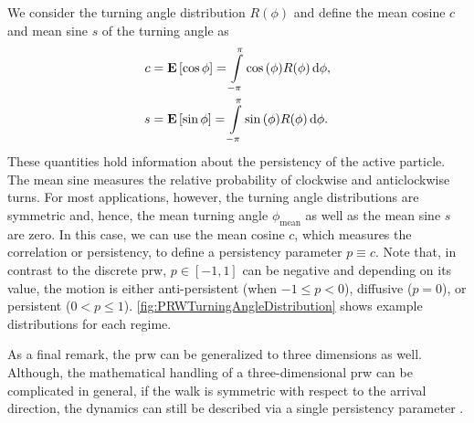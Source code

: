 We consider the turning angle distribution $R(\phi)$ and define the mean cosine $c$ and mean sine $s$ of the turning angle as
\begin{equation*}
 \begin{aligned}
  c &= \operatorname{\mathbf{E}}\left[\cos{\phi}\right] = \int\limits_{-\pi}^\pi \cos{(\phi)} R(\phi) \mathop{}\!\mathrm{d} \phi,
  \\
  s &= \operatorname{\mathbf{E}}\left[\sin{\phi}\right] = \int\limits_{-\pi}^\pi \sin{(\phi)} R(\phi) \mathop{}\!\mathrm{d} \phi.
 \end{aligned}
\end{equation*}
These quantities hold information about the persistency of the active particle. The mean sine measures the relative probability of clockwise and anticlockwise turns. For most applications, however, the turning angle distributions are symmetric and, hence, the mean turning angle $\phi_{\textrm{mean}}$ as well as the mean sine $s$ are zero. In this case, we can use the mean cosine $c$, which measures the correlation or persistency, to define a persistency parameter $p \equiv c$. Note that, in contrast to the discrete \ac{prw}, $p\in[-1,1]$ can be negative and depending on its value, the motion is either anti-persistent (when $-1 \leq p < 0$), diffusive ($p=0$), or persistent ($0<p\leq1$). \autoref{fig:PRWTurningAngleDistribution} shows example distributions for each regime.

As a final remark, the \ac{prw} can be generalized to three dimensions as well. Although, the mathematical handling of a three-dimensional \ac{prw} can be complicated in general, if the walk is symmetric with respect to the arrival direction, the dynamics can still be described via a single persistency parameter \cite{sadjadi:2015}.




